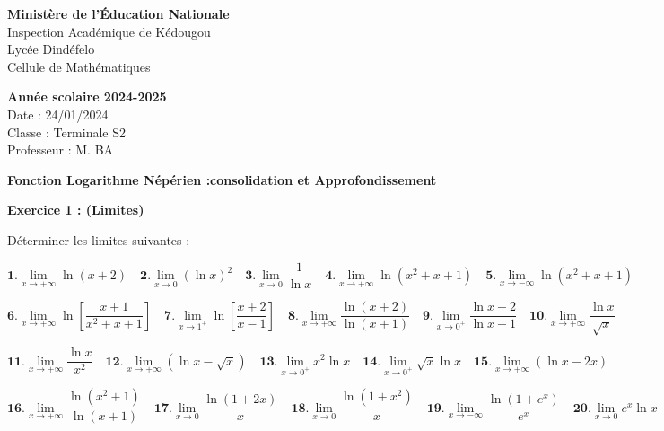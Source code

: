\documentclass[12pt]{article}
\begin{document}
\noindent
\begin{minipage}[t]{0.48\textwidth}
\raggedright
\textbf{Ministère de l'Éducation Nationale}\\
Inspection Académique de Kédougou\\
Lycée Dindéfelo\\
Cellule de Mathématiques
\end{minipage}
\hfill
\begin{minipage}[t]{0.48\textwidth}
\raggedleft
\textbf{Année scolaire 2024-2025}\\
Date : 24/01/2024\\
Classe : Terminale S2\\
Professeur : M. BA
\end{minipage}
\vspace{0.5cm}
\begin{center}
\textbf{Fonction Logarithme Népérien :consolidation et Approfondissement}
\end{center}
\vspace{0.5cm}
\begin{center}
\underline{\textbf{Exercice 1 : (Limites)}}
\end{center}
Déterminer les limites suivantes :

\[
\textbf{1.} \lim_{x \to +\infty} \ln(x+2) \quad 
\textbf{2.} \lim_{x \to 0} (\ln x)^2 \quad 
\textbf{3.} \lim_{x \to 0} \frac{1}{\ln x} \quad 
\textbf{4.} \lim_{x \to +\infty} \ln(x^2 + x + 1) \quad 
\textbf{5.} \lim_{x \to -\infty} \ln(x^2 + x + 1)
\]

\[
\textbf{6.} \lim\limits_{x \to +\infty} \ln\left[ \frac{x+1}{x^2 + x + 1}\right]  \quad 
\textbf{7.} \lim\limits_{x \to 1^+} \ln\left[ \frac{x+2}{x-1}\right]  \quad 
\textbf{8.} \lim\limits_{x \to +\infty} \frac{\ln(x+2)}{\ln(x+1)} \quad 
\textbf{9.} \lim\limits_{x \to 0^+} \frac{\ln x+2}{\ln x+1} \quad
\textbf{10.} \lim\limits_{x \to +\infty} \frac{\ln x}{\sqrt{x}}
\]

\[ 
\textbf{11.} \lim\limits_{x \to +\infty} \frac{\ln x}{x^2} \quad
\textbf{12.} \lim\limits_{x \to +\infty} (\ln x - \sqrt{x}) \quad
\textbf{13.} \lim\limits_{x \to 0^+} x^2 \ln x \quad
\textbf{14.} \lim\limits_{x \to 0^+} \sqrt{x} \ln x \quad
\textbf{15.} \lim\limits_{x \to +\infty} (\ln x - 2x)
\]

\[ 
\textbf{16.} \lim\limits_{x \to +\infty} \frac{\ln(x^2 + 1)}{\ln(x+1)} \quad 
\textbf{17.} \lim\limits_{x \to 0} \frac{\ln(1 + 2x)}{x} \quad 
\textbf{18.} \lim\limits_{x \to 0} \frac{\ln(1 + x^2)}{x} \quad
\textbf{19.} \lim\limits_{x \to -\infty} \frac{\ln(1 + e^x)}{e^x} \quad
\textbf{20.} \lim\limits_{x \to 0} e^x \ln x
\]
\end{document}
